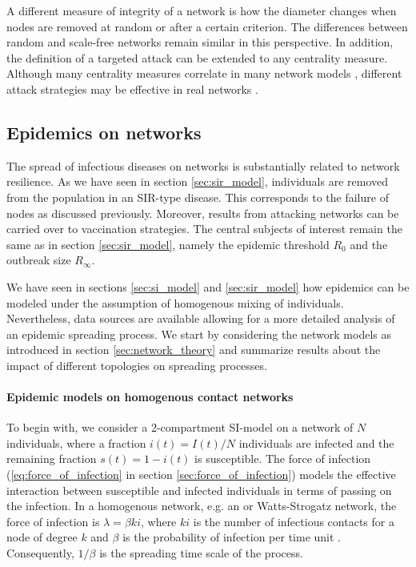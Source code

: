 \documentclass[openright,twoside,headsepline]{scrbook}
\begin{document}
A different measure of integrity of a network is how the diameter changes when nodes are removed at random or after a certain criterion.
The differences between random and scale-free networks remain similar in this perspective.
In addition, the definition of a targeted attack can be extended to any centrality measure.
Although many centrality measures correlate in many network models \citep{dynamical_processes}, different attack strategies may be effective in real networks \citep{holme:2002}.

\subsection{Epidemics on networks}\label{sec:epi_networks}
The spread of infectious diseases on networks is substantially related to network resilience.
As we have seen in section \ref{sec:sir_model}, individuals are removed from the population in an SIR-type disease.
This corresponds to the failure of nodes as discussed previously.
Moreover, results from attacking networks can be carried over to vaccination strategies.
The central subjects of interest remain the same as in section \ref{sec:sir_model}, namely the epidemic threshold $R_0$ and the outbreak size $R_\infty $.

We have seen in sections \ref{sec:si_model} and \ref{sec:sir_model} how epidemics can be modeled under the assumption of homogenous mixing of individuals.
Nevertheless, data sources are available allowing for a more detailed analysis of an epidemic spreading process.
We start by considering the network models as introduced in section \ref{sec:network_theory} and summarize results about the impact of different topologies on spreading processes.

\paragraph{Epidemic models on homogenous contact networks\color{Cayenne}{.}}
To begin with, we consider a 2-compartment SI-model on a network of $N$ individuals, where a fraction $i(t)=I(t)/N$ individuals are infected and the remaining fraction $s(t)=1-i(t)$ is susceptible.
The force of infection (\eqref{eq:force_of_infection} in section \ref{sec:force_of_infection}) models the effective interaction between susceptible and infected individuals in terms of passing on the infection.
In a homogenous network, e.g. an \ER or Watts-Strogatz network, the force of infection is $\lambda = \beta ki$, where $ki$ is the number of infectious contacts for a node of degree $k$ and $\beta $ is the probability of infection per time unit \citep{dynamical_processes}.
Consequently, $1/\beta $ is the spreading time scale of the process.
\end{document}
